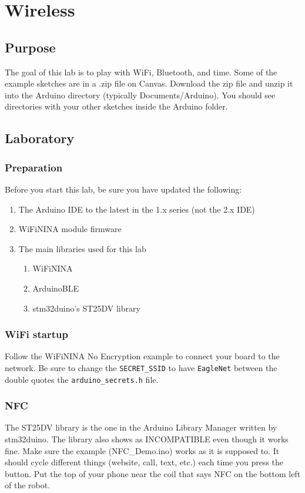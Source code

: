 \chapter{Wireless}

\section{Purpose}
The goal of this lab is to play with WiFi, Bluetooth, and time. Some of the example
sketches are in a .zip file on Canvas. Download the zip file and unzip it into the 
Arduino directory (typically Documents/Arduino). You should see directories with 
your other sketches inside the Arduino folder.

\section{Laboratory}
\subsection{Preparation}
Before you start this lab, be sure you have updated the following:
\begin{enumerate}
    \item The Arduino IDE to the latest in the 1.x series (not the 2.x IDE)
    \item WiFiNINA module firmware
    \item The main libraries used for this lab 
    \begin{enumerate}
        \item WiFiNINA
        \item ArduinoBLE
        \item stm32duino's ST25DV library
    \end{enumerate}
\end{enumerate}

\subsection{WiFi startup}
Follow the WiFiNINA No Encryption example to connect your board to the network. Be 
sure to change the \lstinline|SECRET_SSID| to have \lstinline|EagleNet| between the 
double quotes the \lstinline|arduino_secrets.h| file.

\subsection{NFC}
The ST25DV library is the one in the Arduino Library Manager written by stm32duino.
The library also shows as INCOMPATIBLE even though it works fine. Make sure the 
example (NFC\_Demo.ino) works as it is supposed to. It should cycle 
different things (website, call, text, etc.) each time you press the button. Put 
the top of your phone near the coil that says NFC on the bottom left of the robot.

